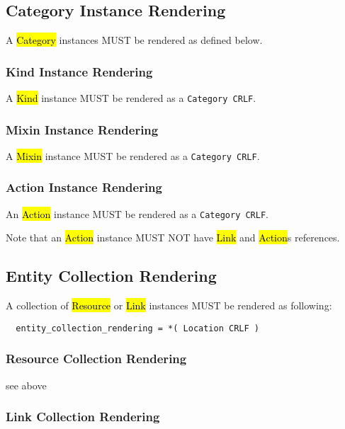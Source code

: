 \documentclass[10pt,a4paper]{article}
\begin{document}

\subsection{Category Instance Rendering}
\label{sec:format_category_instance_rendering}

A \hl{Category} instances MUST be rendered as defined below.

\subsubsection{Kind Instance Rendering}
\label{sec:format_kind}

A \hl{Kind} instance MUST be rendered as a {\tt Category CRLF}.

\subsubsection{Mixin Instance Rendering}
\label{sec:format_mixin}

A \hl{Mixin} instance MUST be rendered as a {\tt Category CRLF}.

\subsubsection{Action Instance Rendering}
\label{sec:format_action}

An \hl{Action} instance MUST be rendered as a {\tt Category CRLF}.

Note that an \hl{Action} instance MUST NOT have \hl{Link} and \hl{Action}s references.

\subsection{Entity Collection Rendering}

A collection of \hl{Resource} or \hl{Link} instances MUST be rendered as following:

\begin{verbatim}
  entity_collection_rendering = *( Location CRLF )
\end{verbatim}

\subsubsection{Resource Collection Rendering}

see above

\subsubsection{Link Collection Rendering}
\end{document}
